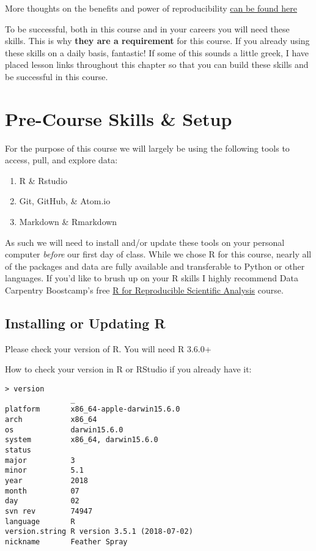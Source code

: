 \documentclass[]{book}
\providecommand{\tightlist}{%
  \setlength{\itemsep}{0pt}\setlength{\parskip}{0pt}}
\begin{document}
More thoughts on the benefits and power of reproducibility \href{https://github.com/katharynduffy/ECOSS_reproducible_science}{can be found here}

To be successful, both in this course and in your careers you will need these skills. This is why \textbf{they are a requirement} for this course. If you already using these skills on a daily basis, fantastic! If some of this sounds a little greek, I have placed lesson links throughout this chapter so that you can build these skills and be successful in this course.

\hypertarget{pre-course-skills-setup}{%
\section{Pre-Course Skills \& Setup}\label{pre-course-skills-setup}}

For the purpose of this course we will largely be using the following tools to access, pull, and explore data:

\begin{enumerate}
\def\labelenumi{\arabic{enumi}.}
\tightlist
\item
  R \& Rstudio
\item
  Git, GitHub, \& Atom.io
\item
  Markdown \& Rmarkdown
\end{enumerate}

As such we will need to install and/or update these tools on your personal computer \emph{before} our first day of class. While we chose R for this course, nearly all of the packages and data are fully available and transferable to Python or other languages. If you'd like to brush up on your R skills I highly recommend Data Carpentry Boostcamp's free \href{http://swcarpentry.github.io/r-novice-gapminder}{R for Reproducible Scientific Analysis} course.

\hypertarget{installing-or-updating-r}{%
\subsection{Installing or Updating R}\label{installing-or-updating-r}}

Please check your version of R. You will need R 3.6.0+

How to check your version in R or RStudio if you already have it:

\begin{verbatim}
> version
               _                           
platform       x86_64-apple-darwin15.6.0   
arch           x86_64                      
os             darwin15.6.0                
system         x86_64, darwin15.6.0        
status                                     
major          3                           
minor          5.1                         
year           2018                        
month          07                          
day            02                          
svn rev        74947                       
language       R                           
version.string R version 3.5.1 (2018-07-02)
nickname       Feather Spray  
\end{verbatim}
\end{document}
